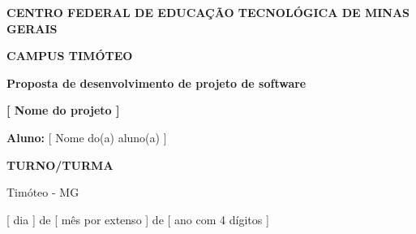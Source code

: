 \begin{center}

\begin{Large}
    \textbf{CENTRO FEDERAL DE EDUCAÇÃO TECNOLÓGICA DE MINAS GERAIS }
\end{Large}

\vspace{0.5cm}

\begin{normalsize}
    \textbf{CAMPUS TIMÓTEO}
\end{normalsize}

\vspace{5cm}

\begin{Huge}

    \textbf{Proposta de desenvolvimento de projeto de software}
    
    \vspace{0.5cm}
    
   \textbf{ {\color{red}[ Nome do projeto ]}}
    
\end{Huge}

\vspace{5cm}

\textbf{Aluno: } {\color{red} [ Nome do(a) aluno(a) ]}

\vspace{0.5cm}

\textbf{{\color{red}TURNO/TURMA}}

\vspace{2cm}

Timóteo - MG

\vspace{1cm}

{\color{red} [ dia ]} de {\color{red} [ mês por extenso ] } de {\color{red} [ ano com 4 dígitos ] }

\end{center}

\newpage